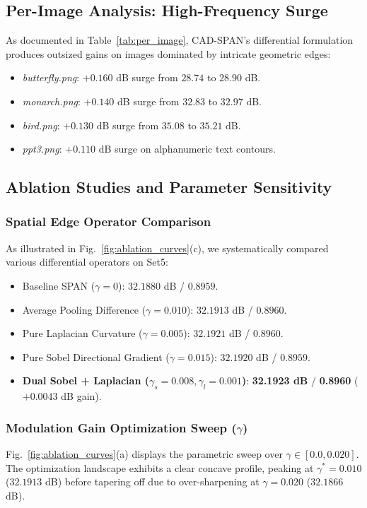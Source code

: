 \documentclass[conference]{IEEEtran}
\begin{document}
\subsection{Per-Image Analysis: High-Frequency Surge}
As documented in Table~\ref{tab:per_image}, CAD-SPAN's differential formulation produces outsized gains on images dominated by intricate geometric edges:
\begin{itemize}
    \item \textit{butterfly.png}: $+0.160$ dB surge from $28.74$ to $28.90$ dB.
    \item \textit{monarch.png}: $+0.140$ dB surge from $32.83$ to $32.97$ dB.
    \item \textit{bird.png}: $+0.130$ dB surge from $35.08$ to $35.21$ dB.
    \item \textit{ppt3.png}: $+0.110$ dB surge on alphanumeric text contours.
\end{itemize}

\subsection{Ablation Studies and Parameter Sensitivity}

\subsubsection{Spatial Edge Operator Comparison}
As illustrated in Fig.~\ref{fig:ablation_curves}(c), we systematically compared various differential operators on Set5:
\begin{itemize}
    \item Baseline SPAN ($\gamma=0$): $32.1880$ dB / $0.8959$.
    \item Average Pooling Difference ($\gamma=0.010$): $32.1913$ dB / $0.8960$.
    \item Pure Laplacian Curvature ($\gamma=0.005$): $32.1921$ dB / $0.8960$.
    \item Pure Sobel Directional Gradient ($\gamma=0.015$): $32.1920$ dB / $0.8959$.
    \item \textbf{Dual Sobel + Laplacian ($\gamma_s=0.008, \gamma_l=0.001$)}: \textbf{32.1923 dB} / \textbf{0.8960} ($+0.0043$ dB gain).
\end{itemize}

\subsubsection{Modulation Gain Optimization Sweep ($\gamma$)}
Fig.~\ref{fig:ablation_curves}(a) displays the parametric sweep over $\gamma \in [0.0, 0.020]$. The optimization landscape exhibits a clear concave profile, peaking at $\gamma^* = 0.010$ ($32.1913$ dB) before tapering off due to over-sharpening at $\gamma = 0.020$ ($32.1866$ dB).
\end{document}
